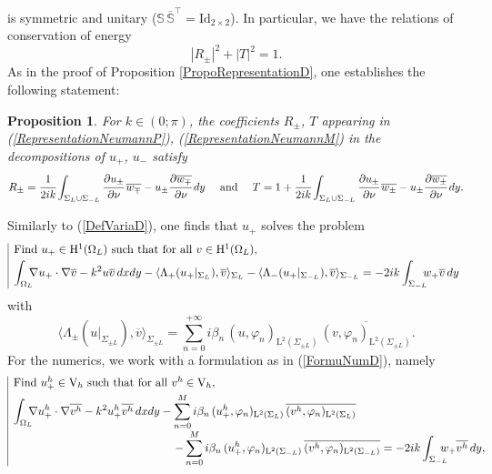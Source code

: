 \documentclass[11pt,a4paper]{report}
\newcommand{\dsp}{\displaystyle}
\newcommand{\Om}{\Omega}
\newcommand{\mrm}[1]{\mathrm{#1}}
\newcommand{\mL}{\mrm{L}}
\newcommand{\mH}{\mrm{H}}
\newcommand{\mV}{\mrm{V}}
\newtheorem{proposition}[theorem]{Proposition}
\begin{document}
is symmetric and unitary ($\mathbb{S}\,\overline{\mathbb{S}}^{\top}=\mrm{Id}_{2\times2}$). In particular, we have the relations of conservation of energy
\begin{equation}\label{ConservationNRJ_Neumann}
|R_\pm|^2+|T|^2=1.
\end{equation}
As in the proof of Proposition \ref{PropoRepresentationD}, one establishes the following statement:
\begin{proposition}\label{PropoRepresentationN}
For $k\in(0;\pi)$, the coefficients $R_{\pm}$, $T$ appearing in (\ref{RepresentationNeumannP}), (\ref{RepresentationNeumannM}) in the decompositions of $u_+$, $u_-$ satisfy
\[
R_{\pm}=\cfrac{1}{2ik}\dsp\int_{\Sigma_{L}\cup\Sigma_{-L}}\cfrac{\partial u_\pm}{\partial \nu}\,\overline{w_\mp}-u_\pm\cfrac{\partial \overline{w_\mp}}{\partial \nu}\,dy\quad \mbox{ and }\quad T=1+\cfrac{1}{2ik}\dsp\int_{\Sigma_{L}\cup\Sigma_{-L}}\cfrac{\partial u_\pm}{\partial \nu}\,\overline{w_\pm}-u_\pm\cfrac{\partial \overline{w_\pm}}{\partial \nu}\,dy.
\]
\end{proposition}
\noindent Similarly to (\ref{DefVariaD}), one finds that $u_+$ solves the problem
\[
\begin{array}{|l}
\mbox{Find }u_+\in\mH^1(\Om_L) \mbox{ such that for all }v\in\mH^1(\Om_L),\\[3pt]
\dsp\int_{\Om_L}\hspace{-0.2cm}\nabla u_+\cdot\nabla\overline{v}-k^2 u\overline{v}\,dxdy-\langle\Lambda_+(u_+|_{\Sigma_{L}}),\overline{v} \rangle_{\Sigma_L}-\langle\Lambda_-(u_+|_{\Sigma_{-L}}),\overline{v} \rangle_{\Sigma_{-L}}=-2ik\int_{\Sigma_{-L}}\hspace{-0.2cm}w_+\overline{v}\,dy
\end{array}
\]
with 
\[
\langle\Lambda_\pm(u|_{\Sigma_{\pm L}}),\overline{v}\rangle_{\Sigma_{\pm L}} = \dsp\sum_{n=0}^{+\infty} i\beta_n\, (u,\varphi_n)_{\mL^2(\Sigma_{\pm L})}\,\overline{(v,\varphi_n)_{\mL^2(\Sigma_{\pm L})}}.
\]
\noindent For the numerics, we work with a formulation as in (\ref{FormuNumD}), namely
\[
\begin{array}{|l}
\mbox{Find }u^h_+\in\mV_h \mbox{ such that for all }v^h\in\mV_h,\\[3pt]
\dsp\int_{\Om_L}\hspace{-0.2cm}\nabla u^h_+\cdot\nabla\overline{v^h}-k^2 u^h_+\overline{v^h}\,dxdy-
 \dsp\sum_{n=0}^{M} i\beta_n\, (u^h_+,\varphi_n)_{\mL^2(\Sigma_{ L})}\,\overline{(v^h,\varphi_n)_{\mL^2(\Sigma_{ L})}}\\[10pt]
\hspace{4.95cm}-\dsp\sum_{n=0}^{M} i\beta_n\, (u^h_+,\varphi_n)_{\mL^2(\Sigma_{ -L})}\,\overline{(v^h,\varphi_n)_{\mL^2(\Sigma_{-L})}}
=-2ik\int_{\Sigma_{-L}}\hspace{-0.3cm}w_+\overline{v^h}\,dy,
\end{array}\hspace{-0.8cm}
\]
\end{document}
